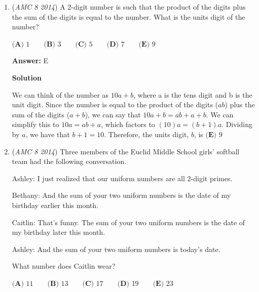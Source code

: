\begin{enumerate}
 



\textbf{Solution 3 (Modulo Arithmetic)}

If $n$ is divisible by $3$, the sum of it's digits should also be divisible by $3$. This means that $19+A+B (\mod 3) \equiv 0$ or $A+B+1 (\mod 3) \equiv 0$. For equation $2$, $15+A+B+C (\mod 3) \equiv 0$ or $A+B+C (\mod 3) \equiv 0$. Logically, you can see the correlation between our first and second equations so we can make the assumption, $C =\boxed{\textbf{(A) }1}$~RandomMathGuy500

 


 


	\item (\textit{AMC 8 2014}) A 2-digit number is such that the product of the digits plus the sum of the digits is equal to the number. What is the units digit of the number?


 $\textbf{(A) }1\qquad\textbf{(B) }3\qquad\textbf{(C) }5\qquad\textbf{(D) }7\qquad\textbf{(E) }9$

 \textbf{Answer: }E



\textbf{Solution}

We can think of the number as $10a+b$, where a is the tens digit and b is the unit digit. Since the number is equal to the product of the digits ($ab$) plus the sum of the digits ($a+b$), we can say that $10a+b=ab+a+b$. We can simplify this to $10a=ab+a$, which factors to $(10)a=(b+1)a$. Dividing by $a$, we have that $b+1=10$. Therefore, the units digit, $b$, is $\boxed{\textbf{(E) }9}$



	\item (\textit{AMC 8 2014}) Three members of the Euclid Middle School girls' softball team had the following conversation.


 Ashley: I just realized that our uniform numbers are all 2-digit primes.


 Bethany: And the sum of your two uniform numbers is the date of my birthday earlier this month.


 Caitlin: That's funny. The sum of your two uniform numbers is the date of my birthday later this month.


 Ashley: And the sum of your two uniform numbers is today's date.


 What number does Caitlin wear?


 $\textbf{(A) }11\qquad\textbf{(B) }13\qquad\textbf{(C) }17\qquad\textbf{(D) }19\qquad\textbf{(E) }23$


\end{enumerate}
